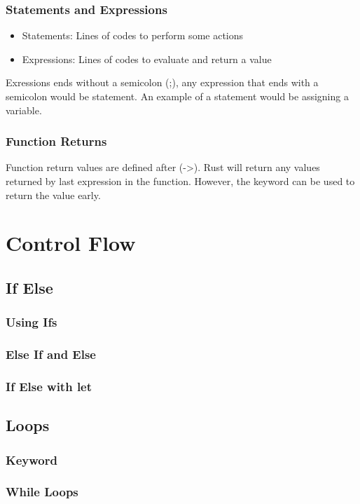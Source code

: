 \documentclass{beamer}
\begin{document}
\begin{frame}
  \frametitle{Statements and Expressions}
  \begin{itemize}
    \item{Statements: Lines of codes to perform some actions}
    \item{Expressions: Lines of codes to evaluate and return a value}
  \end{itemize}
  Exressions ends without a semicolon (;), any expression that ends with a semicolon would be statement. An example of a statement would be assigning a variable.
  
\end{frame}

\begin{frame}
  \frametitle{Function Returns}
  Function return values are defined after (->). Rust will return any values returned by last expression in the function. However, the  keyword can be used to return the value early.
  
\end{frame}

\section{Control Flow}
\subsection{If Else}
\begin{frame}
  \frametitle{Using Ifs}
\end{frame}

\begin{frame}
  \frametitle{Else If and Else}
\end{frame}

\begin{frame}
  \frametitle{If Else with let}
\end{frame}

\subsection{Loops}
\begin{frame}
  \frametitle{ Keyword}
\end{frame}

\begin{frame}
  \frametitle{While Loops}
\end{frame}
\end{document}
